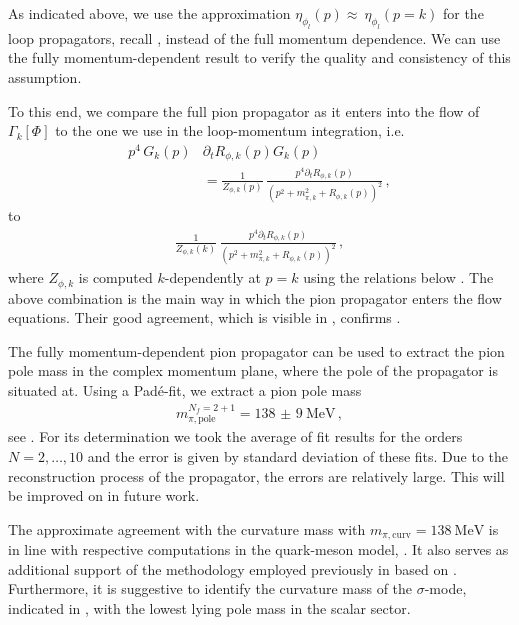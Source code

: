 \documentclass[aps,twocolumn,prd,superscriptaddress]{revtex4-2}
\begin{document}
As indicated above, we use the approximation $\eta_{\phi_l}(p) \approx~\eta_{\phi_l}(p=k)$ for the loop propagators, recall , instead of the full momentum dependence. We can use the fully momentum-dependent result to verify the quality and consistency of this assumption. 

To this end, we compare the full pion propagator as it enters into the flow of $\Gamma_k[\Phi]$ to the one we use in the loop-momentum integration, i.e.
%
\begin{align}\nonumber 
	p^4\,G_k(p)&\partial_t R_{\phi,k}(p)G_k(p) \\[1ex]
	&=\frac{1}{Z_{\phi,k}(p)} \, \frac{p^4\partial_t R_{\phi,k}(p)}{(p^2 + m_{\pi,k}^2+R_{\phi,k}(p))^2}\,,
\label{eq:FlowGPi_p}
\end{align}
%
to
%
\begin{align}\label{eq:FlowGPi_k}
	\frac{1}{Z_{\phi,k}(k)} \, \frac{p^4\partial_t R_{\phi,k}(p)}{(p^2 + m_{\pi,k}^2+R_{\phi,k}(p))^2}\,,
\end{align}
%
where $Z_{\phi,k}$ is computed $k$-dependently at $p=k$ using the relations below . The above combination is the main way in which the pion propagator enters the flow equations.
Their good agreement, which is visible in , confirms .


The fully momentum-dependent pion propagator can be used to extract the pion pole mass in the complex momentum plane, where the pole of the propagator is situated at. Using a Pad\'e-fit, we extract a pion pole mass
%
\begin{align}\label{eq:padePole}
	m^{N_f=2+1}_{\pi,\textrm{pole}}	= \qty{138(9)}{\MeV}\,,
\end{align}
%
see . For its determination we took the average of fit results for the orders $N=2,\dotsc,10$ and the error is given by standard deviation of these fits.
Due to the reconstruction process of the propagator, the errors are relatively large. This will be improved on in future work.

The approximate agreement with the curvature mass  with $m_{\pi,\textrm{curv}}=\qty{138}{\MeV}$ is in line with respective computations in the quark-meson model, \cite{Helmboldt:2014iya}. It also serves as additional support of the methodology employed previously in \cite{Fu:2019hdw} based on \cite{Helmboldt:2014iya}. Furthermore, it is suggestive to identify the curvature mass of the $\sigma$-mode, indicated in , with the lowest lying pole mass in the scalar sector.
\end{document}
